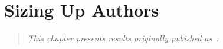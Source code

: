 \chapter{Sizing Up Authors}
\label{ch:contrib}

\begin{quote}
\textit{This chapter presents results originally pubished
as~\cite{Adler2008a}.}
\end{quote}










